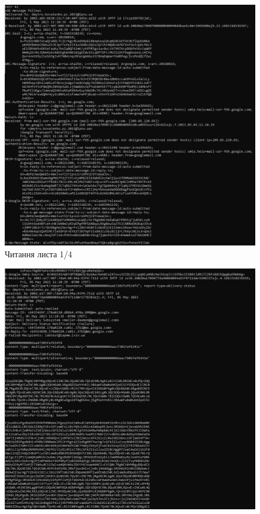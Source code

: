 \documentclass{article}
\begin{document}
\begin{normalsize}
\begin{figure}[H]
\end{figure}
\begin{figure}[H]
	\centering
	\includegraphics[width=\textwidth]{23}
	\caption{Читання листа 1/4}
\end{figure}
\begin{figure}[H]
	\centering
	\includegraphics[width=\textwidth]{24}

\end{figure}
\end{normalsize}
\end{document}
